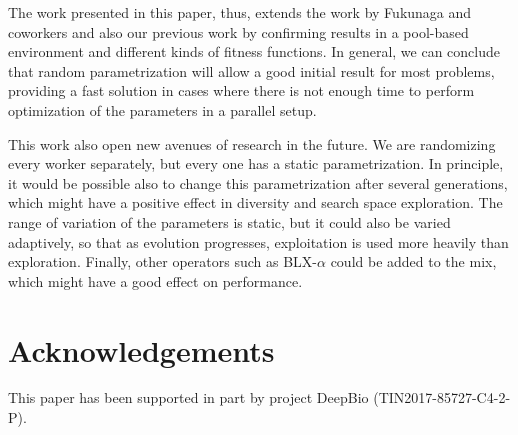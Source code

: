 \documentclass[conference]{IEEEtran}
\begin{document}
The work presented in this paper, thus, extends the work by Fukunaga
and coworkers and also our previous work by confirming  results in a pool-based environment and
different kinds of fitness functions. In general, we can conclude that
random parametrization will allow a good initial result for most
problems, providing a fast solution in cases where there is not enough
time to perform optimization of the parameters in a parallel setup.

This work also open new avenues of research in the future. We are randomizing every worker separately, but every one has a static parametrization. In principle, it would be possible also to change this parametrization after several generations, which might have a positive effect in diversity and search space exploration. The range of variation of the parameters is static, but it could also be varied adaptively, so that as evolution progresses, exploitation is used more heavily than exploration. Finally, other operators such as BLX-$\alpha$ could be added to the mix, which might have a good effect on performance.

\section*{Acknowledgements}

This paper has been supported in part by project DeepBio (TIN2017-85727-C4-2-P).






\end{document}
